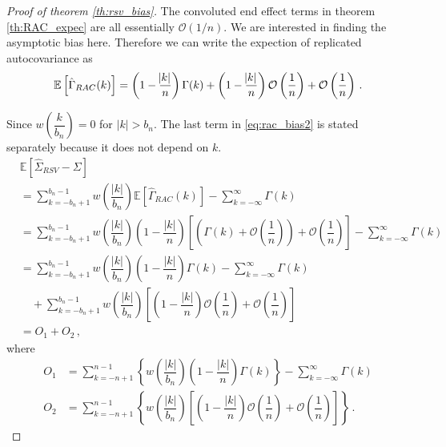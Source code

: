 \documentclass[11pt]{article}
\theoremstyle{remark}
\begin{document}
\begin{proof}[Proof of theorem \ref{th:rsv_bias}]
The convoluted end effect terms in theorem \ref{th:RAC_expec} are all essentially $\mathcal{O}(1/n)$. We are interested in finding the asymptotic bias here. Therefore we can write the expection of replicated autocovariance as 
\begin{equation} \label{eq:rac_bias2}
\mathbb{E} \left[\hat{\Gamma}_{RAC}(k) \right] = \left(1 - \dfrac{\abs{k}}{n}\right)\Gamma(k) + \left(1 - \dfrac{\abs{k}}{n}\right)\mathcal{O}\left(\dfrac{1}{n}\right) + \mathcal{O}\left(\dfrac{1}{n}\right)    \,.
\end{equation}

Since $w\left(\dfrac{k}{b_n}\right) = 0$ for $|k| > b_n$. 
The last term in \eqref{eq:rac_bias2} is stated separately because it does not depend on $k$. 
\begin{align*}
    &\mathbb{E} \left[\hat{\Sigma}_{RSV} - \Sigma \right]\\
    &= \sum_{k=-b_n+1}^{b_n-1} w\left(\dfrac{|k|}{b_n}\right)\mathbb{E} \left[\hat{\Gamma}_{RAC}(k) \right] - \sum_{k=-\infty}^{\infty}\Gamma(k)\\
    &= \sum_{k=-b_n+1}^{b_n-1}  w\left(\dfrac{|k|}{b_n}\right)\left(1-\dfrac{|k|}{n}\right)\left[\left(\Gamma(k) + \mathcal{O}\left(\dfrac{1}{n}\right)\right) + \mathcal{O}\left(\dfrac{1}{n}\right)\right]  - \sum_{k=-\infty}^{\infty}\Gamma(k)\\
    &= \sum_{k=-b_n+1}^{b_n-1} w\left(\dfrac{|k|}{b_n}\right)\left(1-\dfrac{|k|}{n}\right)\Gamma(k)  - \sum_{k=-\infty}^{\infty}\Gamma(k)\\
    & \quad + \sum_{k=-b_n+1}^{b_n-1}  w\left(\dfrac{|k|}{b_n}\right)\left[\left(1-\dfrac{|k|}{n}\right)\mathcal{O}\left(\dfrac{1}{n}\right) + \mathcal{O}\left(\dfrac{1}{n}\right)\right] \\ 
    & = O_1 + O_2\,,
\end{align*}
%
where 
\begin{align*}
O_1 & = \sum\limits_{k=-n+1}^{n-1}\left\{w\left(\dfrac{|k|}{b_n}\right)\left(1-\dfrac{|k|}{n}\right)\Gamma(k) \right\} - \sum\limits_{k=-\infty}^{\infty}\Gamma(k) \\ 
O_2 &= \sum\limits_{k=-n+1}^{n-1}\left\{w\left(\dfrac{|k|}{b_n}\right)\left[\left(1-\dfrac{|k|}{n}\right)\mathcal{O}\left(\dfrac{1}{n}\right) + \mathcal{O}\left(\dfrac{1}{n}\right)\right] \right\}\,.
\end{align*}


\end{proof}
\end{document}
